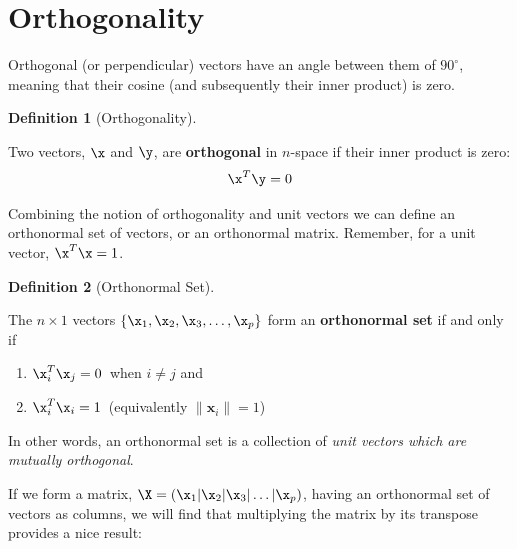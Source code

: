 \documentclass[
]{article}
\providecommand{\tightlist}{%
  \setlength{\itemsep}{0pt}\setlength{\parskip}{0pt}}
\theoremstyle{definition}
\newtheorem{definition}{Definition}[section]
\theoremstyle{definition}
\theoremstyle{definition}
\theoremstyle{definition}
\theoremstyle{remark}
\begin{document}
\hypertarget{orthog}{%
\section{Orthogonality}\label{orthog}}

Orthogonal (or perpendicular) vectors have an angle between them of \(90^{\circ}\), meaning that their cosine (and subsequently their inner product) is zero.

\begin{definition}[Orthogonality]
\protect\hypertarget{def:orthogdef}{}\label{def:orthogdef}

Two vectors, \(\x\) and \(\y\), are \textbf{orthogonal} in \(n\)-space if their inner product is zero:
\[\x^T\y=0\]

\end{definition}

Combining the notion of orthogonality and unit vectors we can define an orthonormal set of vectors, or an orthonormal matrix. Remember, for a unit vector, \(\x^T\x = 1\).\\

\begin{definition}[Orthonormal Set]
\protect\hypertarget{def:orthsetdef}{}\label{def:orthsetdef}

The \(n\times 1\) vectors \(\{\x_1,\x_2,\x_3,\dots,\x_p\}\) form an \textbf{orthonormal set} if and only if

\begin{enumerate}
\def\labelenumi{\arabic{enumi}.}
\tightlist
\item
  \(\x_i^T\x_j = 0\,\) when \(i \ne j\) and\\
\item
  \(\x_i^T\x_i = 1\,\) (equivalently \(\|\mathbf{x}_i\|=1\))
\end{enumerate}

In other words, an orthonormal set is a collection of \emph{unit vectors which are mutually orthogonal}.

\end{definition}

If we form a matrix, \(\X=(\x_1|\x_2|\x_3|\dots|\x_p )\), having an orthonormal set of vectors as columns, we will find that multiplying the matrix by its transpose provides a nice result:
\end{document}

